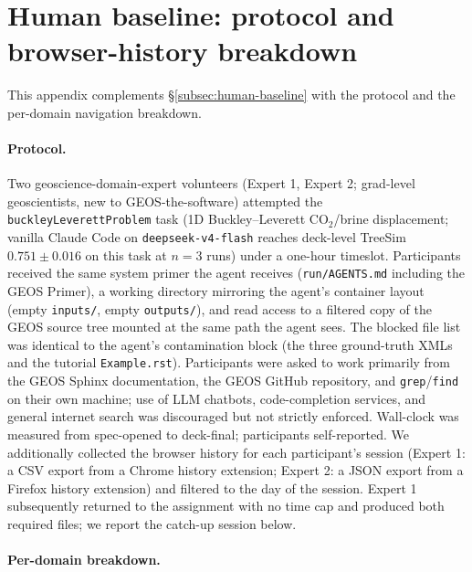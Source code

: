 \documentclass{article}
\begin{document}
\section{Human baseline: protocol and browser-history breakdown}
\label{app:human-browser}

This appendix complements \S\ref{subsec:human-baseline} with the protocol and the per-domain navigation breakdown.

\paragraph{Protocol.} Two geoscience-domain-expert volunteers (Expert 1, Expert 2; grad-level geoscientists, new to GEOS-the-software) attempted the \texttt{buckleyLeverettProblem} task (1D Buckley--Leverett CO$_2$/brine displacement; vanilla Claude Code on \texttt{deepseek-v4-flash} reaches deck-level TreeSim $0.751 \pm 0.016$ on this task at $n=3$ runs) under a one-hour timeslot. Participants received the same system primer the agent receives (\texttt{run/AGENTS.md} including the GEOS Primer), a working directory mirroring the agent's container layout (empty \texttt{inputs/}, empty \texttt{outputs/}), and read access to a filtered copy of the GEOS source tree mounted at the same path the agent sees. The blocked file list was identical to the agent's contamination block (the three ground-truth XMLs and the tutorial \texttt{Example.rst}). Participants were asked to work primarily from the GEOS Sphinx documentation, the GEOS GitHub repository, and \texttt{grep}/\texttt{find} on their own machine; use of LLM chatbots, code-completion services, and general internet search was discouraged but not strictly enforced. Wall-clock was measured from spec-opened to deck-final; participants self-reported. We additionally collected the browser history for each participant's session (Expert 1: a CSV export from a Chrome history extension; Expert 2: a JSON export from a Firefox history extension) and filtered to the day of the session. Expert 1 subsequently returned to the assignment with no time cap and produced both required files; we report the catch-up session below.

\paragraph{Per-domain breakdown.}
\end{document}

